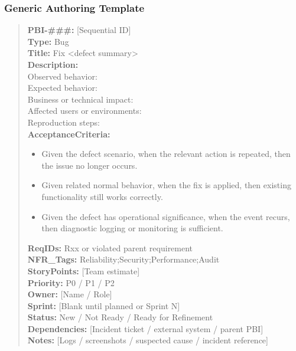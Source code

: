 \documentclass[11pt,a4paper]{article}
\begin{document}
\subsubsection*{Generic Authoring Template}
\begin{quote}
\textbf{PBI-\#\#\#:} [Sequential ID] \\
\textbf{Type:} Bug \\
\textbf{Title:} Fix \textless defect summary\textgreater \\

\textbf{Description:} \\
Observed behavior: \\
Expected behavior: \\
Business or technical impact: \\
Affected users or environments: \\
Reproduction steps: \\

\textbf{AcceptanceCriteria:}
\begin{itemize}[leftmargin=1.5em]
    \item Given the defect scenario, when the relevant action is repeated, then the issue no longer occurs.
    \item Given related normal behavior, when the fix is applied, then existing functionality still works correctly.
    \item Given the defect has operational significance, when the event recurs, then diagnostic logging or monitoring is sufficient.
\end{itemize}

\textbf{ReqIDs:} Rxx or violated parent requirement \\
\textbf{NFR\_Tags:} Reliability;Security;Performance;Audit \\
\textbf{StoryPoints:} [Team estimate] \\
\textbf{Priority:} P0 / P1 / P2 \\
\textbf{Owner:} [Name / Role] \\
\textbf{Sprint:} [Blank until planned or Sprint N] \\
\textbf{Status:} New / Not Ready / Ready for Refinement \\
\textbf{Dependencies:} [Incident ticket / external system / parent PBI] \\
\textbf{Notes:} [Logs / screenshots / suspected cause / incident reference]
\end{quote}
\end{document}
